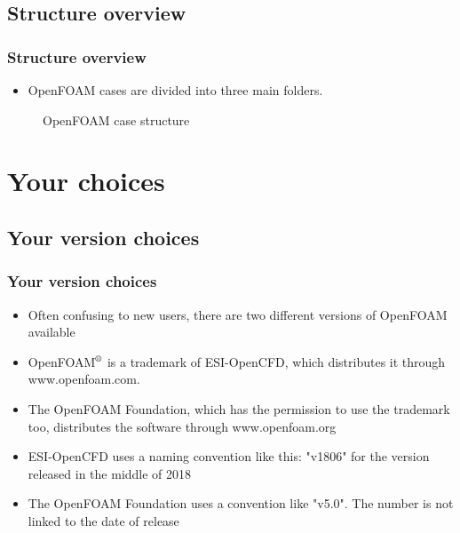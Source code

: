 \documentclass[notheorems, aspectratio=169]{beamer}
\begin{document}
\subsection{Structure overview}
\begin{frame}
\frametitle{Structure overview}
\begin{itemize}
  \item OpenFOAM cases are divided into three main folders. 
\end{itemize}

\begin{figure}[h!]
  \begin{center}
    \scalebox{.75}{}
  \caption{OpenFOAM case structure}
  \label{fig:ofStructure}
  \end{center}
  \end{figure}

\end{frame}

\section{Your choices}
\frame{\tableofcontents[currentsection]}


\subsection{Your version choices}
\begin{frame}
\frametitle{Your version choices}
\begin{itemize}
  \item Often confusing to new users, there are two different versions of OpenFOAM available
  \item OpenFOAM$^{\tiny{\text{\textregistered}}}$ is a trademark of ESI-OpenCFD, which distributes it through www.openfoam.com. 
  \item The OpenFOAM Foundation, which has the permission to use the trademark too, distributes the software through www.openfoam.org
  \item ESI-OpenCFD uses a naming convention like this: "v1806" for the version released in the middle of 2018
  \item The OpenFOAM Foundation uses a convention like "v5.0". The number is not linked to the date of release

\end{itemize}
\end{frame}
\end{document}
